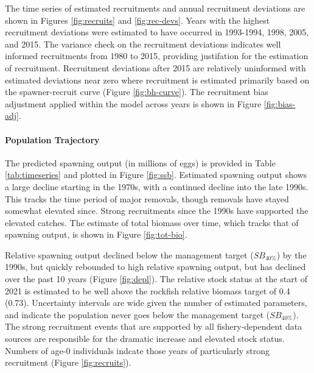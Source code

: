 \documentclass[11pt,
  english,
  a4paper,
]{article}
\begin{document}

The time series of estimated recruitments and annual recruitment deviations are shown in Figures \ref{fig:recruits} and \ref{fig:rec-devs}. Years with the highest recruitment deviations were estimated to have occurred in 1993-1994, 1998, 2005, and 2015. The variance check on the recruitment deviations indicates well informed recruitments from 1980 to 2015, providing justifation for the estimation of recruitment. Recruitment deviations after 2015 are relatively uninformed with estimated deviations near zero where recruitment is estimated primarily based on the spawner-recruit curve (Figure \ref{fig:bh-curve}). The recruitment bias adjustment applied within the model across years is shown in Figure \ref{fig:bias-adj}.

\leavevmode\tagmcend\tagstructend\par


\hypertarget{population-trajectory}{%
\paragraph{Population Trajectory}\label{population-trajectory}}

\leavevmode\tagmcend\tagstructend


The predicted spawning output (in millions of eggs) is provided in Table \ref{tab:timeseries} and plotted in Figure \ref{fig:ssb}. Estimated spawning output shows a large decline starting in the 1970s, with a continued decline into the late 1990s. This tracks the time period of major removals, though removals have stayed somewhat elevated since. Strong recruitments since the 1990s have supported the elevated catches. The estimate of total biomass over time, which tracks that of spawning output, is shown in Figure \ref{fig:tot-bio}.

\leavevmode\tagmcend\tagstructend\par


Relative spawning output declined below the management target ({\(SB_{40\%}\)\leavevmode\tagmcend\tagstructend}) by the 1990s, but quickly rebounded to high relative spawning output, but has declined over the past 10 years (Figure \ref{fig:depl}). The relative stock status at the start of 2021 is estimated to be well above the rockfish relative biomass target of 0.4 (0.73). Uncertainty intervals are wide given the number of estimated parameters, and indicate the population never goes below the management target ({\(SB_{40\%}\)\leavevmode\tagmcend\tagstructend}). The strong recruitment events that are supported by all fishery-dependent data sources are responsible for the dramatic increase and elevated stock status. Numbers of age-0 individuals indcate those years of particularly strong recruitment (Figure \ref{fig:recruits}).
\end{document}
